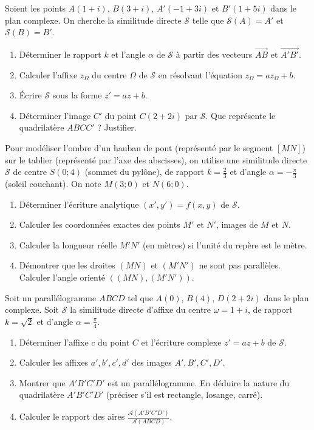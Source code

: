 \documentclass[11pt]{article}
\begin{document}
\begin{exercice}
Soient les points $A(1+i)$, $B(3+i)$, $A'(-1+3i)$ et $B'(1+5i)$ dans le plan complexe. On cherche la similitude directe $\mathcal{S}$ telle que $\mathcal{S}(A)=A'$ et $\mathcal{S}(B)=B'$.
\begin{enumerate}
    \item Déterminer le rapport $k$ et l'angle $\alpha$ de $\mathcal{S}$ à partir des vecteurs $\overrightarrow{AB}$ et $\overrightarrow{A'B'}$.
    \item Calculer l'affixe $z_\Omega$ du centre $\Omega$ de $\mathcal{S}$ en résolvant l'équation $z_\Omega = a z_\Omega + b$.
    \item Écrire $\mathcal{S}$ sous la forme $z' = az + b$.
    \item Déterminer l'image $C'$ du point $C(2+2i)$ par $\mathcal{S}$. Que représente le quadrilatère $ABCC'$ ? Justifier.
\end{enumerate}
\end{exercice}

\begin{exercice}
Pour modéliser l'ombre d'un hauban de pont (représenté par le segment $[MN]$) sur le tablier (représenté par l'axe des abscisses), on utilise une similitude directe $\mathcal{S}$ de centre $S(0;4)$ (sommet du pylône), de rapport $k = \frac{2}{3}$ et d'angle $\alpha = -\frac{\pi}{3}$ (soleil couchant). On note $M(3;0)$ et $N(6;0)$.
\begin{enumerate}
    \item Déterminer l'écriture analytique $(x',y') = f(x,y)$ de $\mathcal{S}$.
    \item Calculer les coordonnées exactes des points $M'$ et $N'$, images de $M$ et $N$.
    \item Calculer la longueur réelle $M'N'$ (en mètres) si l'unité du repère est le mètre.
    \item Démontrer que les droites $(MN)$ et $(M'N')$ ne sont pas parallèles. Calculer l'angle orienté $((MN),(M'N'))$.
\end{enumerate}
\end{exercice}

\begin{exercice}
Soit un parallélogramme $ABCD$ tel que $A(0)$, $B(4)$, $D(2+2i)$ dans le plan complexe. Soit $\mathcal{S}$ la similitude directe d'affixe du centre $\omega = 1+i$, de rapport $k=\sqrt{2}$ et d'angle $\alpha = \frac{\pi}{4}$.
\begin{enumerate}
    \item Déterminer l'affixe $c$ du point $C$ et l'écriture complexe $z' = az + b$ de $\mathcal{S}$.
    \item Calculer les affixes $a', b', c', d'$ des images $A', B', C', D'$.
    \item Montrer que $A'B'C'D'$ est un parallélogramme. En déduire la nature du quadrilatère $A'B'C'D'$ (préciser s'il est rectangle, losange, carré).
    \item Calculer le rapport des aires $\frac{\mathcal{A}(A'B'C'D')}{\mathcal{A}(ABCD)}$.
\end{enumerate}
\end{exercice}
\end{document}
